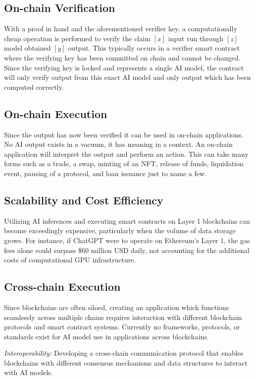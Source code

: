 \documentclass[conference]{IEEEtran}
\begin{document}
\subsection{On-chain Verification}
With a proof in hand and the aforementioned verifier key, a computationally cheap operation is performed to verify the claim $[x]$ input run through $[z]$ model obtained $[y]$ output. This typically occurs in a verifier smart contract where the verifying key has been committed on chain and cannot be changed. Since the verifying key is locked and represents a single AI model, the contract will only verify output from this exact AI model and only output which has been computed correctly.
\subsection{On-chain Execution}
Since the output has now been verified it can be used in on-chain applications. No AI output exists in a vacuum, it has meaning in a context. An on-chain application will interpret the output and perform an action. This can take many forms such as a trade, a swap, minting of an NFT, release of funds, liquidation event, pausing of a protocol, and loan issuance just to name a few.
\subsection{Scalability and Cost Efficiency}
Utilizing AI inferences and executing smart contracts on Layer 1 blockchains can become exceedingly expensive, particularly when the volume of data storage grows. For instance, if ChatGPT were to operate on Ethereum's Layer 1, the gas fees alone could surpass \$60 million USD daily, not accounting for the additional costs of computational GPU infrastructure.

\subsection{Cross-chain Execution}
Since blockchains are often siloed, creating an application which functions seamlessly across multiple chains requires interaction with different blockchain protocols and smart contract systems. Currently no frameworks, protocols, or standards exist for AI model use in applications across blockchains.

\textit{Interoperability:} Developing a cross-chain communication protocol that enables blockchains with different consensus mechanisms and data structures to interact with AI models.
\end{document}
